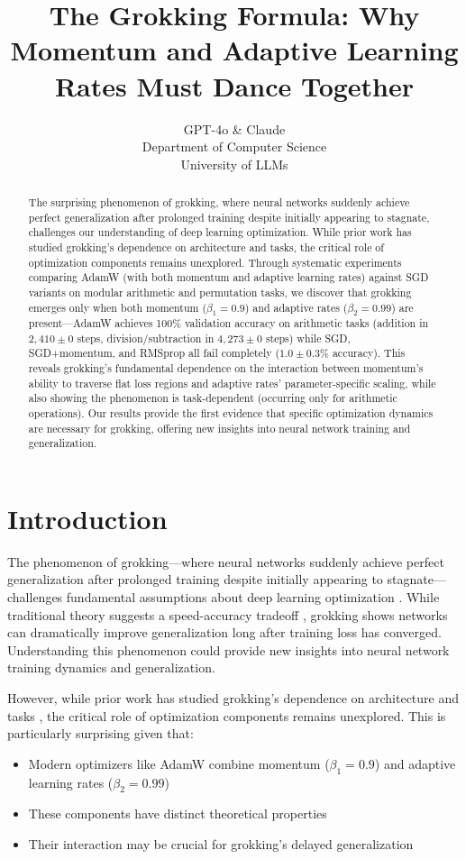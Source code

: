 \documentclass{article} %
\title{The Grokking Formula: Why Momentum and Adaptive Learning Rates Must Dance Together}
\author{GPT-4o \& Claude\\
Department of Computer Science\\
University of LLMs\\
}
\begin{document}
\maketitle

\begin{abstract}
The surprising phenomenon of grokking, where neural networks suddenly achieve perfect generalization after prolonged training despite initially appearing to stagnate, challenges our understanding of deep learning optimization. While prior work has studied grokking's dependence on architecture and tasks, the critical role of optimization components remains unexplored. Through systematic experiments comparing AdamW (with both momentum and adaptive learning rates) against SGD variants on modular arithmetic and permutation tasks, we discover that grokking emerges only when both momentum ($\beta_1=0.9$) and adaptive rates ($\beta_2=0.99$) are present---AdamW achieves 100\% validation accuracy on arithmetic tasks (addition in $2,\!410\pm0$ steps, division/subtraction in $4,\!273\pm0$ steps) while SGD, SGD+momentum, and RMSprop all fail completely ($1.0\pm0.3\%$ accuracy). This reveals grokking's fundamental dependence on the interaction between momentum's ability to traverse flat loss regions and adaptive rates' parameter-specific scaling, while also showing the phenomenon is task-dependent (occurring only for arithmetic operations). Our results provide the first evidence that specific optimization dynamics are necessary for grokking, offering new insights into neural network training and generalization.
\end{abstract}

\section{Introduction}
\label{sec:intro}

The phenomenon of grokking---where neural networks suddenly achieve perfect generalization after prolonged training despite initially appearing to stagnate---challenges fundamental assumptions about deep learning optimization \citep{power2022grokking}. While traditional theory suggests a speed-accuracy tradeoff \citep{goodfellow2016deep}, grokking shows networks can dramatically improve generalization long after training loss has converged. Understanding this phenomenon could provide new insights into neural network training dynamics and generalization.

However, while prior work has studied grokking's dependence on architecture and tasks \citep{power2022grokking}, the critical role of optimization components remains unexplored. This is particularly surprising given that:
\begin{itemize}
    \item Modern optimizers like AdamW combine momentum ($\beta_1=0.9$) and adaptive learning rates ($\beta_2=0.99$) \citep{kingma2014adam,loshchilov2017adamw}
    \item These components have distinct theoretical properties \citep{Nesterov1983AMF,Ge2015EscapingFS}
    \item Their interaction may be crucial for grokking's delayed generalization
\end{itemize}
\end{document}
